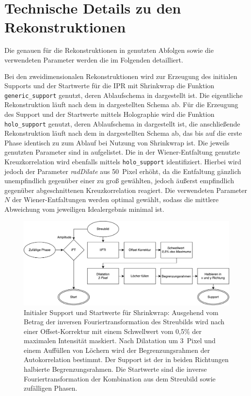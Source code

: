 \chapter{Technische Details zu den Rekonstruktionen}
\label{app:param}
Die genauen für die Rekonstruktionen in  genutzten Abfolgen sowie die verwendeten Parameter werden die im Folgenden detailliert.

Bei den zweidimensionalen Rekonstruktionen wird zur Erzeugung des initialen Supports und der Startwerte für die IPR mit Shrinkwrap die Funktion \texttt{generic\_support} genutzt, deren Ablaufschema in  dargestellt ist. Die eigentliche Rekonstruktion läuft nach dem in  dargestellten Schema ab.
Für die Erzeugung des Support und der Startwerte mittels Holographie wird die Funktion \texttt{holo\_support} genutzt, deren Ablaufschema in  dargestellt ist, die anschließende Rekonstruktion läuft nach dem in  dargestellten Schema ab, das bis auf die erste Phase identisch zu zum Ablauf bei Nutzung von Shrinkwrap ist.
Die jeweils genutzten Parameter sind in  aufgelistet.
Die in der Wiener-Entfaltung genutzte Kreuzkorrelation wird ebenfalls mittels \texttt{holo\_support} identifiziert. Hierbei wird jedoch der Parameter \textit{radDilate} aus \SI{50}{Pixel} erhöht, da die Entfaltung gänzlich unempfindlich gegenüber einer zu groß gewählten, jedoch äußerst empfindlich gegenüber abgeschnittenen Kreuzkorrelation reagiert. Die verwendeten Parameter $N$ der Wiener-Entfaltungen werden optimal gewählt, sodass die mittlere Abweichung vom jeweiligen Idealergebnis minimal ist.

\begin{figure}
	\centering
	\includegraphics[width=.85\textwidth]{images/flow_genericsupport.pdf}
	\caption[Initialer Support für Shrinkwrap]{Initialer Support und Startwerte für Shrinkwrap: Ausgehend vom Betrag der inversen Fouriertransformation des Streubilds wird nach einer Offset-Korrektur mit einem Schwellwert vom 0,5\% der maximalen Intensität maskiert. Nach Dilatation um \SI{3}{Pixel} und einem Auffüllen von Löchern wird der Begrenzungsrahmen der Autokorrelation bestimmt. Der Support ist der in beiden Richtungen halbierte Begrenzungsrahmen. Die Startwerte sind die inverse Fouriertransformation der Kombination aus dem Streubild sowie zufälligen Phasen.}
	\label{fig:flow_genericsupport}
\end{figure} 

